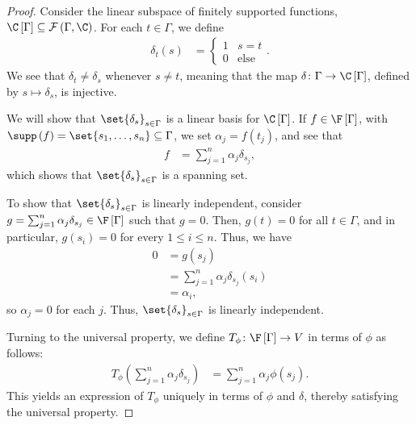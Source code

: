 \begin{proof}
  Consider the linear subspace of finitely supported functions, $\C\left[\Gamma\right]\subseteq \mathcal{F}\left(\Gamma,\C\right)$. For each $t\in \Gamma$, we define
  \begin{align*}
    \delta_t\left(s\right) &= \begin{cases}
      1 & s=t\\
      0 & \text{else}
    \end{cases}.
  \end{align*}
    We see that $\delta_t\neq \delta_s$ whenever $s\neq t$, meaning that the map $\delta\colon \Gamma\rightarrow \C\left[\Gamma\right]$, defined by $s \mapsto \delta_s$, is injective.\newline

    We will show that $\set{\delta_s}_{s\in \Gamma}$ is a linear basis for $\C\left[\Gamma\right]$. If $f\in \F\left[\Gamma\right]$, with $\supp\left(f\right) = \set{s_1,\dots,s_n}\subseteq \Gamma$, we set $\alpha_j = f\left(t_j\right)$, and see that
    \begin{align*}
      f &= \sum_{j=1}^{n}\alpha_j\delta_{s_j},
    \end{align*}
    which shows that $\set{\delta_s}_{s\in\Gamma}$ is a spanning set.\newline

    To show that $\set{\delta_s}_{s\in\Gamma}$ is linearly independent, consider $g = \sum_{j=1}^{n}\alpha_j\delta_{s_j}\in \F\left[\Gamma\right]$ such that $g = 0$. Then, $g(t) = 0$ for all $t\in\Gamma$, and in particular, $g\left(s_i\right) = 0$ for every $1 \leq i \leq n$. Thus, we have
    \begin{align*}
      0 &= g\left(s_j\right)\\
        &= \sum_{j=1}^{n}\alpha_j\delta_{s_j}\left(s_i\right)\\
        &= \alpha_i,
    \end{align*}
    so $\alpha_j = 0$ for each $j$. Thus, $\set{\delta_s}_{s\in \Gamma}$ is linearly independent.\newline

    Turning to the universal property, we define $T_{\phi}\colon \F\left[\Gamma\right]\rightarrow V$ in terms of $\phi$ as follows:
    \begin{align*}
      T_{\phi}\left(\sum_{j=1}^{n}\alpha_j\delta_{s_j}\right) &= \sum_{j=1}^{n}\alpha_j\phi\left(s_j\right).
    \end{align*}
    This yields an expression of $T_{\phi}$ uniquely in terms of $\phi$ and $\delta$, thereby satisfying the universal property.
\end{proof}
